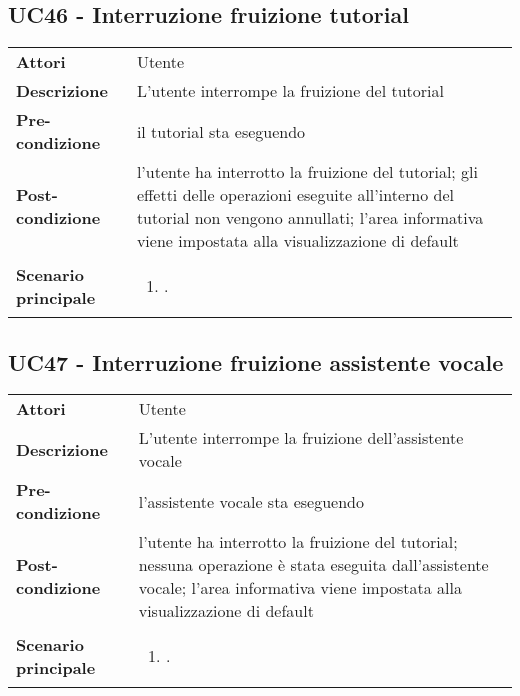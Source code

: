 \subsection{UC46 - Interruzione fruizione tutorial} 
\label{sssec:UC46} 
\def\arraystretch{1.5}
\begin{tabularx}{\textwidth}{l|p{}}
	\rowcolor{I} \multicolumn{2}{c}{\color{white}\textbf{UC46 - Interruzione fruizione tutorial}} \\
	\toprule
	\endhead
	\textbf{Attori} & Utente\\
	\textbf{Descrizione} & L'utente interrompe la fruizione del tutorial\\
	\textbf{Pre-condizione} & il tutorial sta eseguendo\\
	\textbf{Post-condizione} & l'utente ha interrotto la fruizione del tutorial; gli effetti delle operazioni eseguite all'interno del tutorial non vengono annullati; l'area informativa viene impostata alla visualizzazione di default\\
	\textbf{Scenario principale} & \vspace{-1.2em}\begin{enumerate}[leftmargin=*,noitemsep,nosep]
		\item \nameref{sssec:UC46}.
	\end{enumerate}\\
	\bottomrule
\end{tabularx}
\subsection{UC47 - Interruzione fruizione assistente vocale} 
\label{sssec:UC47} 
\def\arraystretch{1.5}
\begin{tabularx}{\textwidth}{l|p{}}
	\rowcolor{I} \multicolumn{2}{c}{\color{white}\textbf{UC47 - Interruzione fruizione assistente vocale}} \\
	\toprule
	\endhead
	\textbf{Attori} & Utente\\
	\textbf{Descrizione} & L'utente interrompe la fruizione dell'assistente vocale\\
	\textbf{Pre-condizione} & l'assistente vocale sta eseguendo\\
	\textbf{Post-condizione} & l'utente ha interrotto la fruizione del tutorial; nessuna operazione è stata eseguita dall'assistente vocale; l'area informativa viene impostata alla visualizzazione di default\\
	\textbf{Scenario principale} & \vspace{-1.2em}\begin{enumerate}[leftmargin=*,noitemsep,nosep]
		\item \nameref{sssec:UC47}.
	\end{enumerate}\\
	\bottomrule
\end{tabularx}
